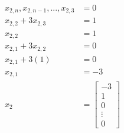 \documentclass[a4paper]{article}
\begin{document}
\paragraph{}
\begin{equation*}
\begin{split}
x_{2,n}, x_{2,n-1}, ... ,x_{2,3}&=0\\
x_{2,2} + 3x_{2,3} &=1\\
x_{2,2} &= 1\\
x_{2,1} + 3x_{2,2} &=0\\
x_{2,1} + 3(1) &=0 \\
x_{2,1} &= -3\\
    x_2 &= \begin{bmatrix}
   -3 \\ 1 \\ 0 \\ \vdots\\ 0
        \end{bmatrix}\\
\end{split}
\end{equation*}
\end{document}
